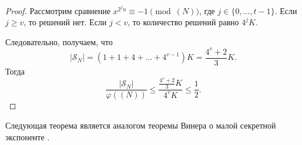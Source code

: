 \documentclass[_00_dissertation.tex]{subfiles}
\begin{document}
\begin{proof}
    Рассмотрим сравнение $x^{2^j u} \equiv -1 \pmod{(N)}$, где $j \in \{0, \dots, t - 1\}$.
    Если $j \ge v$, то решений нет.
    Если $j < v$, то количество решений равно $4^j K$.
    
    Следовательно, получаем, что
    \begin{equation*}
        |\mathcal{S}_N| = \left(
            1 + 1 + 4 + \dots + 4^{v-1}
        \right)K = \frac{4^v + 2}{3}K.
    \end{equation*}
    Тогда
    \begin{equation*}
        \frac{|\mathcal{S}_N|}{\varphi((N))} \le \frac{\frac{4^v + 2}{3}K}{4^v K} \le \frac{1}{2}.
    \end{equation*}
\end{proof}

Следующая теорема является аналогом теоремы Винера о малой секретной экспоненте \cite{source:Wiener}.
\end{document}
